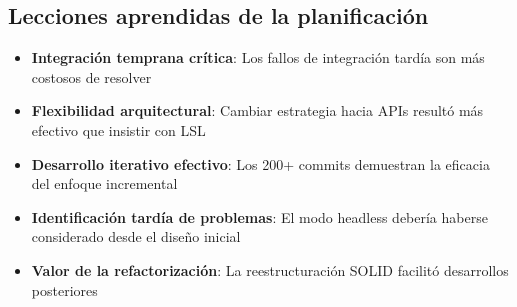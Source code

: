 \begin{table}[hp!]
  \centering
  \caption{Impacto de los principales desvíos del proyecto}
  \label{tab:impacto_desvios}
\end{table}

\subsection{Lecciones aprendidas de la planificación}

\begin{itemize}
    \item \textbf{Integración temprana crítica}: Los fallos de integración tardía son más costosos de resolver
    \item \textbf{Flexibilidad arquitectural}: Cambiar estrategia hacia APIs resultó más efectivo que insistir con LSL
    \item \textbf{Desarrollo iterativo efectivo}: Los 200+ commits demuestran la eficacia del enfoque incremental
    \item \textbf{Identificación tardía de problemas}: El modo headless debería haberse considerado desde el diseño inicial
    \item \textbf{Valor de la refactorización}: La reestructuración SOLID facilitó desarrollos posteriores
\end{itemize}